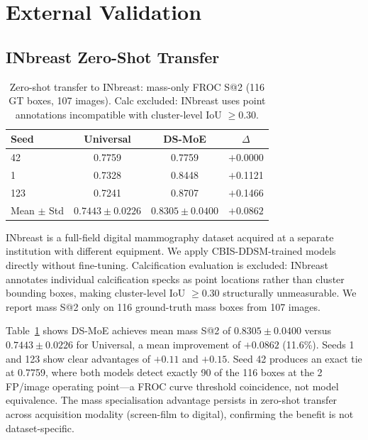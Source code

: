 \documentclass[runningheads]{llncs}
\begin{document}
\section{External Validation}
\label{sec:external}

\subsection{INbreast Zero-Shot Transfer}

\begin{table}[tb]
\caption{Zero-shot transfer to INbreast: mass-only FROC S@2
(116 GT boxes, 107 images). Calc excluded: INbreast uses point
annotations incompatible with cluster-level IoU $\geq 0.30$.}
\label{tab:inbreast}
\centering
\begin{tabular}{lccc}
\toprule
\textbf{Seed} & \textbf{Universal} & \textbf{DS-MoE} & \textbf{$\Delta$}\\
\midrule
42  & 0.7759 & 0.7759 & $+$0.0000\\
1   & 0.7328 & 0.8448 & $+$0.1121\\
123 & 0.7241 & 0.8707 & $+$0.1466\\
\midrule
Mean $\pm$ Std & $0.7443 \pm 0.0226$ & $\mathbf{0.8305 \pm 0.0400}$ & $+0.0862$\\
\bottomrule
\end{tabular}
\end{table}

INbreast \cite{moreira2012inbreast} is a full-field digital mammography
dataset acquired at a separate institution with different equipment.
We apply CBIS-DDSM-trained models directly without fine-tuning.
Calcification evaluation is excluded: INbreast annotates individual
calcification specks as point locations rather than cluster bounding
boxes, making cluster-level IoU $\geq 0.30$ structurally unmeasurable.
We report mass S@2 only on 116 ground-truth mass boxes from 107 images.

Table~\ref{tab:inbreast} shows DS-MoE achieves mean mass S@2 of
$0.8305 \pm 0.0400$ versus $0.7443 \pm 0.0226$ for Universal, a mean
improvement of $+0.0862$ (11.6\%). Seeds 1 and 123 show clear
advantages of $+0.11$ and $+0.15$. Seed 42 produces an exact tie at
0.7759, where both models detect exactly 90 of the 116 boxes at the 2
FP/image operating point---a FROC curve threshold coincidence, not
model equivalence. The mass specialisation advantage persists in
zero-shot transfer across acquisition modality (screen-film to digital),
confirming the benefit is not dataset-specific.
\end{document}

